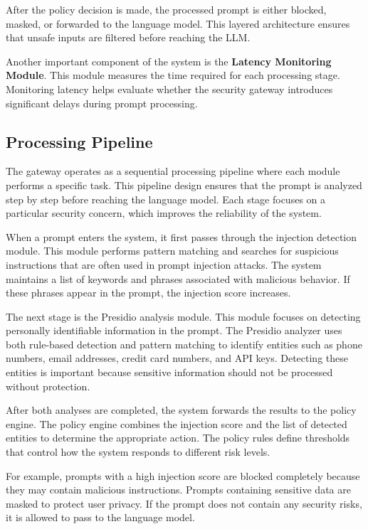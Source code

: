 \documentclass[conference]{IEEEtran}
\begin{document}
After the policy decision is made, the processed prompt is either blocked, masked, or forwarded to the language model. This layered architecture ensures that unsafe inputs are filtered before reaching the LLM.

Another important component of the system is the \textbf{Latency Monitoring Module}. This module measures the time required for each processing stage. Monitoring latency helps evaluate whether the security gateway introduces significant delays during prompt processing.

\subsection{Processing Pipeline}

The gateway operates as a sequential processing pipeline where each module performs a specific task. This pipeline design ensures that the prompt is analyzed step by step before reaching the language model. Each stage focuses on a particular security concern, which improves the reliability of the system.

When a prompt enters the system, it first passes through the injection detection module. This module performs pattern matching and searches for suspicious instructions that are often used in prompt injection attacks. The system maintains a list of keywords and phrases associated with malicious behavior. If these phrases appear in the prompt, the injection score increases.

The next stage is the Presidio analysis module. This module focuses on detecting personally identifiable information in the prompt. The Presidio analyzer uses both rule-based detection and pattern matching to identify entities such as phone numbers, email addresses, credit card numbers, and API keys. Detecting these entities is important because sensitive information should not be processed without protection.

After both analyses are completed, the system forwards the results to the policy engine. The policy engine combines the injection score and the list of detected entities to determine the appropriate action. The policy rules define thresholds that control how the system responds to different risk levels.

For example, prompts with a high injection score are blocked completely because they may contain malicious instructions. Prompts containing sensitive data are masked to protect user privacy. If the prompt does not contain any security risks, it is allowed to pass to the language model.
\end{document}

